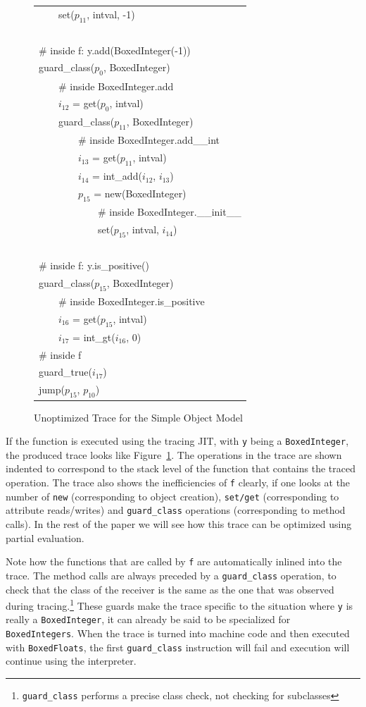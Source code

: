 \documentclass{sigplanconf}
\begin{document}
\begin{figure}
{\begin{tabular}{l}
~~~~set($p_{11}$, intval, -1) \\
~\\
\# inside f: y.add(BoxedInteger(-1)) \\
guard\_class($p_{0}$, BoxedInteger) \\
~~~~\# inside BoxedInteger.add \\
~~~~$i_{12}$ = get($p_{0}$, intval) \\
~~~~guard\_class($p_{11}$, BoxedInteger) \\
~~~~~~~~\# inside BoxedInteger.add\_\_int \\
~~~~~~~~$i_{13}$ = get($p_{11}$, intval) \\
~~~~~~~~$i_{14}$ = int\_add($i_{12}$, $i_{13}$) \\
~~~~~~~~$p_{15}$ = new(BoxedInteger) \\
~~~~~~~~~~~~\# inside BoxedInteger.\_\_init\_\_ \\
~~~~~~~~~~~~set($p_{15}$, intval, $i_{14}$) \\
~\\
\# inside f: y.is\_positive() \\
guard\_class($p_{15}$, BoxedInteger) \\
~~~~\# inside BoxedInteger.is\_positive \\
~~~~$i_{16}$ = get($p_{15}$, intval) \\
~~~~$i_{17}$ = int\_gt($i_{16}$, 0) \\
\# inside f \\
guard\_true($i_{17}$) \\
jump($p_{15}$, $p_{10}$) \\
\end{tabular}
}
\label{fig:unopt-trace}
\caption{Unoptimized Trace for the Simple Object Model}
\end{figure}

If the function is executed using the tracing JIT, with \texttt{y} being a
\texttt{BoxedInteger}, the produced trace looks like
Figure~\ref{fig:unopt-trace}. The operations in the trace are shown indented to
correspond to the stack level of the function that contains the traced
operation. The trace also shows the inefficiencies of \texttt{f} clearly, if one
looks at the number of \texttt{new} (corresponding to object creation),
\texttt{set/get} (corresponding to attribute reads/writes) and
\texttt{guard\_class} operations (corresponding to method calls).
In the rest of the paper we will see how this trace can be optimized using
partial evaluation.

Note how the functions that are called by \texttt{f} are automatically inlined
into the trace. The method calls are always preceded by a \texttt{guard\_class}
operation, to check that the class of the receiver is the same as the one that
was observed during tracing.\footnote{\texttt{guard\_class} performs a precise
class check, not checking for subclasses} These guards make the trace specific
to the situation where \texttt{y} is really a \texttt{BoxedInteger}, it can
already be said to be specialized for \texttt{BoxedIntegers}. When the trace is
turned into machine code and then executed with \texttt{BoxedFloats}, the
first \texttt{guard\_class} instruction will fail and execution will continue
using the interpreter.
\end{document}
